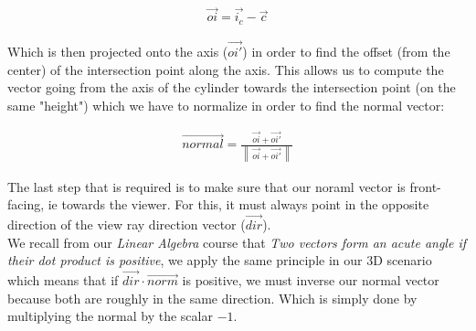 \documentclass{article}
\newcommand{\norm}[1]{\left\lVert\,#1\,\right\rVert}
\begin{document}
    \begin{align*}
        \vec{oi} = \vec{i_c} - \vec{c}
    \end{align*}

    Which is then projected onto the axis ($\vec{oi'}$) in order to find the offset (from the center) of the intersection point along the axis. This allows us to compute the vector going from the axis of the cylinder towards the intersection point (on the same "height") which we have to normalize in order to find the normal vector:

    \begin{align*}
        \vec{normal} = \frac{\vec{oi} + \vec{oi'}}{\norm{\vec{oi} + \vec{oi'}}}
    \end{align*}

    The last step that is required is to make sure that our noraml vector is front-facing, ie towards the viewer. For this, it must always point in the opposite direction of the view ray direction vector ($\vec{dir}$).\\

    We recall from our \textit{Linear Algebra} course that \textit{Two vectors form an acute angle if their dot product is positive}, we apply the same principle in our 3D scenario which means that if $\vec{dir}\cdot\vec{norm}$ is positive, we must inverse our normal vector because both are roughly in the same direction.
    Which is simply done by multiplying the normal by the scalar $-1$.

    
\end{document}
